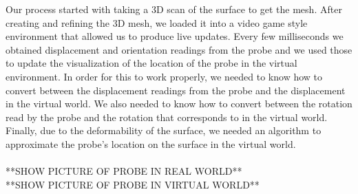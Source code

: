 \documentclass[conference]{acmsiggraph}
\begin{document}
Our process started with taking a 3D scan of the surface to get the mesh. After creating and refining the 3D mesh, we loaded it into a video game style environment that allowed us to produce live updates. Every few milliseconds we obtained displacement and orientation readings from the probe and we used those to update the visualization of the location of the probe in the virtual environment. In order for this to work properly, we needed to know how to convert between the displacement readings from the probe and the displacement in the virtual world. We also needed to know how to convert between the rotation read by the probe and the rotation that corresponds to in the virtual world. Finally, due to the deformability of the surface, we needed an algorithm to approximate the probe's location on the surface in the virtual world.\\
\\
**SHOW PICTURE OF PROBE IN REAL WORLD**\\
**SHOW PICTURE OF PROBE IN VIRTUAL WORLD**
\end{document}
